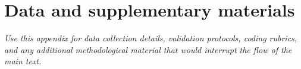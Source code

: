 \chapter{Data and supplementary materials}
\label{app:data}

\textit{Use this appendix for data collection details, validation protocols, coding rubrics, and any additional methodological material that would interrupt the flow of the main text.}
